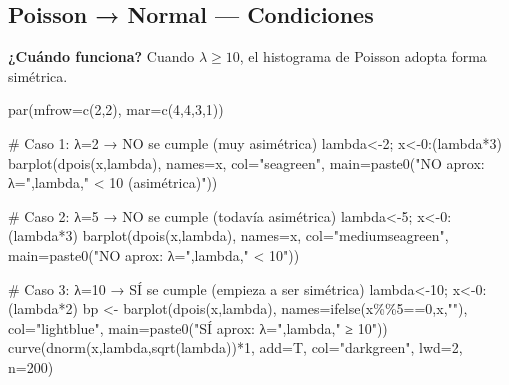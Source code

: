 \documentclass[
  letterpaper,
  DIV=11,
  numbers=noendperiod]{scrartcl}
\newenvironment{Shaded}{\begin{snugshade}}{\end{snugshade}}
\newcommand{\AttributeTok}[1]{\textcolor[rgb]{0.40,0.45,0.13}{#1}}
\newcommand{\CommentTok}[1]{\textcolor[rgb]{0.37,0.37,0.37}{#1}}
\newcommand{\DecValTok}[1]{\textcolor[rgb]{0.68,0.00,0.00}{#1}}
\newcommand{\FunctionTok}[1]{\textcolor[rgb]{0.28,0.35,0.67}{#1}}
\newcommand{\NormalTok}[1]{\textcolor[rgb]{0.00,0.23,0.31}{#1}}
\newcommand{\OtherTok}[1]{\textcolor[rgb]{0.00,0.23,0.31}{#1}}
\newcommand{\SpecialCharTok}[1]{\textcolor[rgb]{0.37,0.37,0.37}{#1}}
\newcommand{\StringTok}[1]{\textcolor[rgb]{0.13,0.47,0.30}{#1}}
\begin{document}
\subsection{Poisson → Normal ---
Condiciones}\label{poisson-normal-condiciones}

\textbf{¿Cuándo funciona?} Cuando \(\lambda \geq 10\), el histograma de
Poisson adopta forma simétrica.

\begin{Shaded}
\begin{Highlighting}[]
\FunctionTok{par}\NormalTok{(}\AttributeTok{mfrow=}\FunctionTok{c}\NormalTok{(}\DecValTok{2}\NormalTok{,}\DecValTok{2}\NormalTok{), }\AttributeTok{mar=}\FunctionTok{c}\NormalTok{(}\DecValTok{4}\NormalTok{,}\DecValTok{4}\NormalTok{,}\DecValTok{3}\NormalTok{,}\DecValTok{1}\NormalTok{))}

\CommentTok{\# Caso 1: λ=2 → NO se cumple (muy asimétrica)}
\NormalTok{lambda}\OtherTok{\textless{}{-}}\DecValTok{2}\NormalTok{; x}\OtherTok{\textless{}{-}}\DecValTok{0}\SpecialCharTok{:}\NormalTok{(lambda}\SpecialCharTok{*}\DecValTok{3}\NormalTok{)}
\FunctionTok{barplot}\NormalTok{(}\FunctionTok{dpois}\NormalTok{(x,lambda), }\AttributeTok{names=}\NormalTok{x, }\AttributeTok{col=}\StringTok{"seagreen"}\NormalTok{,}
        \AttributeTok{main=}\FunctionTok{paste0}\NormalTok{(}\StringTok{"NO aprox: λ="}\NormalTok{,lambda,}\StringTok{" \textless{} 10 (asimétrica)"}\NormalTok{))}

\CommentTok{\# Caso 2: λ=5 → NO se cumple (todavía asimétrica)}
\NormalTok{lambda}\OtherTok{\textless{}{-}}\DecValTok{5}\NormalTok{; x}\OtherTok{\textless{}{-}}\DecValTok{0}\SpecialCharTok{:}\NormalTok{(lambda}\SpecialCharTok{*}\DecValTok{3}\NormalTok{)}
\FunctionTok{barplot}\NormalTok{(}\FunctionTok{dpois}\NormalTok{(x,lambda), }\AttributeTok{names=}\NormalTok{x, }\AttributeTok{col=}\StringTok{"mediumseagreen"}\NormalTok{,}
        \AttributeTok{main=}\FunctionTok{paste0}\NormalTok{(}\StringTok{"NO aprox: λ="}\NormalTok{,lambda,}\StringTok{" \textless{} 10"}\NormalTok{))}

\CommentTok{\# Caso 3: λ=10 → SÍ se cumple (empieza a ser simétrica)}
\NormalTok{lambda}\OtherTok{\textless{}{-}}\DecValTok{10}\NormalTok{; x}\OtherTok{\textless{}{-}}\DecValTok{0}\SpecialCharTok{:}\NormalTok{(lambda}\SpecialCharTok{*}\DecValTok{2}\NormalTok{)}
\NormalTok{bp }\OtherTok{\textless{}{-}} \FunctionTok{barplot}\NormalTok{(}\FunctionTok{dpois}\NormalTok{(x,lambda), }\AttributeTok{names=}\FunctionTok{ifelse}\NormalTok{(x}\SpecialCharTok{\%\%}\DecValTok{5}\SpecialCharTok{==}\DecValTok{0}\NormalTok{,x,}\StringTok{""}\NormalTok{), }\AttributeTok{col=}\StringTok{"lightblue"}\NormalTok{,}
        \AttributeTok{main=}\FunctionTok{paste0}\NormalTok{(}\StringTok{"SÍ aprox: λ="}\NormalTok{,lambda,}\StringTok{" ≥ 10"}\NormalTok{))}
\FunctionTok{curve}\NormalTok{(}\FunctionTok{dnorm}\NormalTok{(x,lambda,}\FunctionTok{sqrt}\NormalTok{(lambda))}\SpecialCharTok{*}\DecValTok{1}\NormalTok{, }\AttributeTok{add=}\NormalTok{T, }\AttributeTok{col=}\StringTok{"darkgreen"}\NormalTok{, }\AttributeTok{lwd=}\DecValTok{2}\NormalTok{, }\AttributeTok{n=}\DecValTok{200}\NormalTok{)}


\end{Highlighting}
\end{Shaded}
\end{document}
